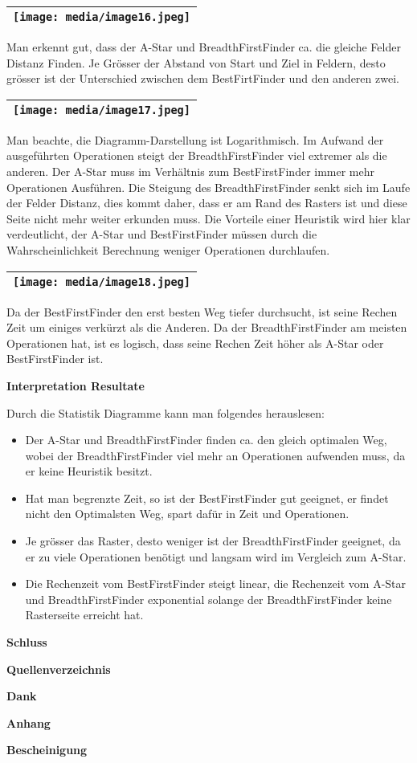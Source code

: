 \begin{longtable}[]{@{}l@{}}
\toprule
\endhead
\texttt{[image: media/image16.jpeg]}\tabularnewline
\bottomrule
\end{longtable}

Man erkennt gut, dass der A-Star und BreadthFirstFinder ca. die gleiche
Felder Distanz Finden. Je Grösser der Abstand von Start und Ziel in
Feldern, desto grösser ist der Unterschied zwischen dem BestFirtFinder
und den anderen zwei.

\begin{longtable}[]{@{}l@{}}
\toprule
\endhead
\texttt{[image: media/image17.jpeg]}\tabularnewline
\bottomrule
\end{longtable}

Man beachte, die Diagramm-Darstellung ist Logarithmisch. Im Aufwand der
ausgeführten Operationen steigt der BreadthFirstFinder viel extremer als
die anderen. Der A-Star muss im Verhältnis zum BestFirstFinder immer
mehr Operationen Ausführen. Die Steigung des BreadthFirstFinder senkt
sich im Laufe der Felder Distanz, dies kommt daher, dass er am Rand des
Rasters ist und diese Seite nicht mehr weiter erkunden muss. Die
Vorteile einer Heuristik wird hier klar verdeutlicht, der A-Star und
BestFirstFinder müssen durch die Wahrscheinlichkeit Berechnung weniger
Operationen durchlaufen.

\begin{longtable}[]{@{}l@{}}
\toprule
\endhead
\texttt{[image: media/image18.jpeg]}\tabularnewline
\bottomrule
\end{longtable}

Da der BestFirstFinder den erst besten Weg tiefer durchsucht, ist seine
Rechen Zeit um einiges verkürzt als die Anderen. Da der
BreadthFirstFinder am meisten Operationen hat, ist es logisch, dass
seine Rechen Zeit höher als A-Star oder BestFirstFinder ist.

\textbf{Interpretation Resultate}

Durch die Statistik Diagramme kann man folgendes herauslesen:

\begin{itemize}
\item
  Der A-Star und BreadthFirstFinder finden ca. den gleich optimalen Weg,
  wobei der BreadthFirstFinder viel mehr an Operationen aufwenden muss,
  da er keine Heuristik besitzt.
\item
  Hat man begrenzte Zeit, so ist der BestFirstFinder gut geeignet, er
  findet nicht den Optimalsten Weg, spart dafür in Zeit und Operationen.
\item
  Je grösser das Raster, desto weniger ist der BreadthFirstFinder
  geeignet, da er zu viele Operationen benötigt und langsam wird im
  Vergleich zum A-Star.
\item
  Die Rechenzeit vom BestFirstFinder steigt linear, die Rechenzeit vom
  A-Star und BreadthFirstFinder exponential solange der
  BreadthFirstFinder keine Rasterseite erreicht hat.
\end{itemize}

\textbf{Schluss}

\textbf{Quellenverzeichnis}

\textbf{Dank}

\textbf{Anhang}

\textbf{Bescheinigung}
